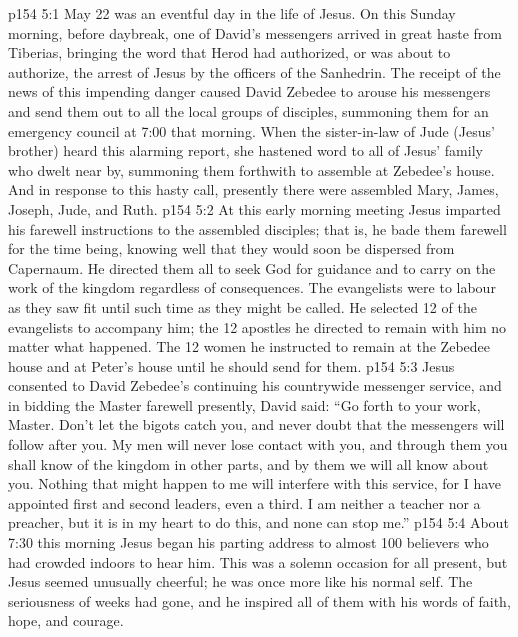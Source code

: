 \vs p154 5:1 May 22 was an eventful day in the life of Jesus. On this Sunday morning, before daybreak, one of David’s messengers arrived in great haste from Tiberias, bringing the word that Herod had authorized, or was about to authorize, the arrest of Jesus by the officers of the Sanhedrin. The receipt of the news of this impending danger caused David Zebedee to arouse his messengers and send them out to all the local groups of disciples, summoning them for an emergency council at 7:00 that morning. When the sister\hyp{}in\hyp{}law of Jude (Jesus’ brother) heard this alarming report, she hastened word to all of Jesus’ family who dwelt near by, summoning them forthwith to assemble at Zebedee’s house. And in response to this hasty call, presently there were assembled Mary, James, Joseph, Jude, and Ruth.
\vs p154 5:2 At this early morning meeting Jesus imparted his farewell instructions to the assembled disciples; that is, he bade them farewell for the time being, knowing well that they would soon be dispersed from Capernaum. He directed them all to seek God for guidance and to carry on the work of the kingdom regardless of consequences. The evangelists were to labour as they saw fit until such time as they might be called. He selected 12 of the evangelists to accompany him; the 12 apostles he directed to remain with him no matter what happened. The 12 women he instructed to remain at the Zebedee house and at Peter’s house until he should send for them.
\vs p154 5:3 Jesus consented to David Zebedee’s continuing his countrywide messenger service, and in bidding the Master farewell presently, David said: “Go forth to your work, Master. Don’t let the bigots catch you, and never doubt that the messengers will follow after you. My men will never lose contact with you, and through them you shall know of the kingdom in other parts, and by them we will all know about you. Nothing that might happen to me will interfere with this service, for I have appointed first and second leaders, even a third. I am neither a teacher nor a preacher, but it is in my heart to do this, and none can stop me.”
\vs p154 5:4 About 7:30 this morning Jesus began his parting address to almost 100 believers who had crowded indoors to hear him. This was a solemn occasion for all present, but Jesus seemed unusually cheerful; he was once more like his normal self. The seriousness of weeks had gone, and he inspired all of them with his words of faith, hope, and courage.
